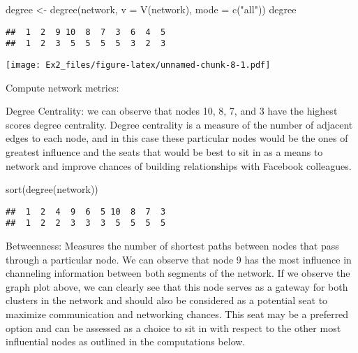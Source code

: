 \documentclass[
]{article}
\newenvironment{Shaded}{\begin{snugshade}}{\end{snugshade}}
\newcommand{\AttributeTok}[1]{\textcolor[rgb]{0.77,0.63,0.00}{#1}}
\newcommand{\DecValTok}[1]{\textcolor[rgb]{0.00,0.00,0.81}{#1}}
\newcommand{\FunctionTok}[1]{\textcolor[rgb]{0.00,0.00,0.00}{#1}}
\newcommand{\NormalTok}[1]{#1}
\newcommand{\OtherTok}[1]{\textcolor[rgb]{0.56,0.35,0.01}{#1}}
\newcommand{\SpecialCharTok}[1]{\textcolor[rgb]{0.00,0.00,0.00}{#1}}
\newcommand{\StringTok}[1]{\textcolor[rgb]{0.31,0.60,0.02}{#1}}
\begin{document}
\begin{Shaded}
\begin{Highlighting}[]
\NormalTok{degree }\OtherTok{\textless{}{-}} \FunctionTok{degree}\NormalTok{(network, }\AttributeTok{v =} \FunctionTok{V}\NormalTok{(network), }\AttributeTok{mode =} \FunctionTok{c}\NormalTok{(}\StringTok{"all"}\NormalTok{))}
\NormalTok{degree}
\end{Highlighting}
\end{Shaded}

\begin{verbatim}
##  1  2  9 10  8  7  3  6  4  5 
##  1  2  3  5  5  5  5  3  2  3
\end{verbatim}

\begin{Shaded}
\end{Shaded}

\texttt{[image: Ex2\_files/figure-latex/unnamed-chunk-8-1.pdf]}

Compute network metrics:

Degree Centrality: we can observe that nodes 10, 8, 7, and 3 have the
highest scores degree centrality. Degree centrality is a measure of the
number of adjacent edges to each node, and in this case these particular
nodes would be the ones of greatest influence and the seats that would
be best to sit in as a means to network and improve chances of building
relationships with Facebook colleagues.

\begin{Shaded}
\begin{Highlighting}[]
\FunctionTok{sort}\NormalTok{(}\FunctionTok{degree}\NormalTok{(network))}
\end{Highlighting}
\end{Shaded}

\begin{verbatim}
##  1  2  4  9  6  5 10  8  7  3 
##  1  2  2  3  3  3  5  5  5  5
\end{verbatim}

Betweenness: Measures the number of shortest paths between nodes that
pass through a particular node. We can observe that node 9 has the most
influence in channeling information between both segments of the
network. If we observe the graph plot above, we can clearly see that
this node serves as a gateway for both clusters in the network and
should also be considered as a potential seat to maximize communication
and networking chances. This seat may be a preferred option and can be
assessed as a choice to sit in with respect to the other most
influential nodes as outlined in the computations below.
\end{document}
